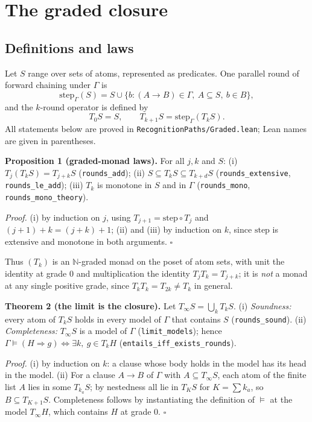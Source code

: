 \section{The graded closure}\label{the-graded-closure}

\subsection{Definitions and laws}\label{definitions-and-laws}

Let \(S\) range over sets of atoms, represented as predicates. One parallel round of forward chaining under \(\Gamma\) is \[\mathrm{step}_\Gamma(S)=S\cup\{b : (A\to B)\in\Gamma,\ A\subseteq S,\ b\in B\},\] and the \(k\)-round operator is defined by \[T_0S=S,\qquad T_{k+1}S=\mathrm{step}_\Gamma(T_kS).\] All statements below are proved in \texttt{RecognitionPaths/Graded.lean}; Lean names are given in parentheses.

\textbf{Proposition 1 (graded-monad laws).} For all \(j,k\) and \(S\): (i) \(T_j(T_kS)=T_{j+k}S\) (\texttt{rounds\_add}); (ii) \(S\subseteq T_kS\subseteq T_{k+d}S\) (\texttt{rounds\_extensive}, \texttt{rounds\_le\_add}); (iii) \(T_k\) is monotone in \(S\) and in \(\Gamma\) (\texttt{rounds\_mono}, \texttt{rounds\_mono\_theory}).

\emph{Proof.} (i) by induction on \(j\), using \(T_{j+1}=\mathrm{step}\circ T_j\) and \((j+1)+k=(j+k)+1\); (ii) and (iii) by induction on \(k\), since \(\mathrm{step}\) is extensive and monotone in both arguments. \(\square\)

Thus \((T_k)\) is an \(\mathbb N\)-graded monad on the poset of atom sets, with unit the identity at grade \(0\) and multiplication the identity \(T_jT_k=T_{j+k}\); it is \emph{not} a monad at any single positive grade, since \(T_kT_k=T_{2k}\neq T_k\) in general.

\textbf{Theorem 2 (the limit is the closure).} Let \(T_\infty S=\bigcup_kT_kS\). (i) \emph{Soundness:} every atom of \(T_kS\) holds in every model of \(\Gamma\) that contains \(S\) (\texttt{rounds\_sound}). (ii) \emph{Completeness:} \(T_\infty S\) is a model of \(\Gamma\) (\texttt{limit\_models}); hence \(\Gamma\models(H\Rightarrow g)\iff\exists k,\ g\in T_kH\) (\texttt{entails\_iff\_exists\_rounds}).

\emph{Proof.} (i) by induction on \(k\): a clause whose body holds in the model has its head in the model. (ii) For a clause \(A\to B\) of \(\Gamma\) with \(A\subseteq T_\infty S\), each atom of the finite list \(A\) lies in some \(T_{k_a}S\); by nestedness all lie in \(T_KS\) for \(K=\sum k_a\), so \(B\subseteq
T_{K+1}S\). Completeness follows by instantiating the definition of \(\models\) at the model \(T_\infty H\), which contains \(H\) at grade \(0\). \(\square\)

